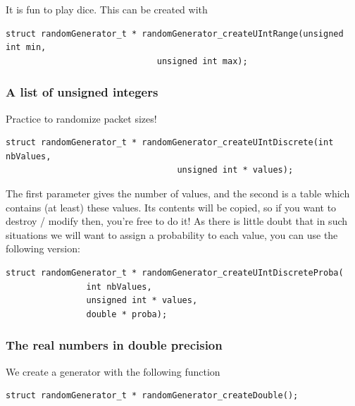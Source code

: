    It is fun to play dice. This can be created with

\begin{verbatim}
struct randomGenerator_t * randomGenerator_createUIntRange(unsigned int min,
						      unsigned int max);
\end{verbatim}

%
\subsubsection{A list of unsigned integers}

   Practice to randomize packet sizes!

\begin{verbatim}
struct randomGenerator_t * randomGenerator_createUIntDiscrete(int nbValues,
							      unsigned int * values);
\end{verbatim}

   The first parameter gives the number of values, and the second is 
a table which contains (at least) these values. Its contents will be
copied, so if you want to destroy / modify then, you're free to do it!
   As there is little doubt that in such situations we will
want to assign a probability to each value, you can use the
following version:

\begin{verbatim}
struct randomGenerator_t * randomGenerator_createUIntDiscreteProba(
				int nbValues,
				unsigned int * values,
				double * proba);
\end{verbatim}

%
\subsubsection{The real numbers in double precision}

   We create a generator with the following function

\begin{verbatim}
struct randomGenerator_t * randomGenerator_createDouble();
\end{verbatim}

